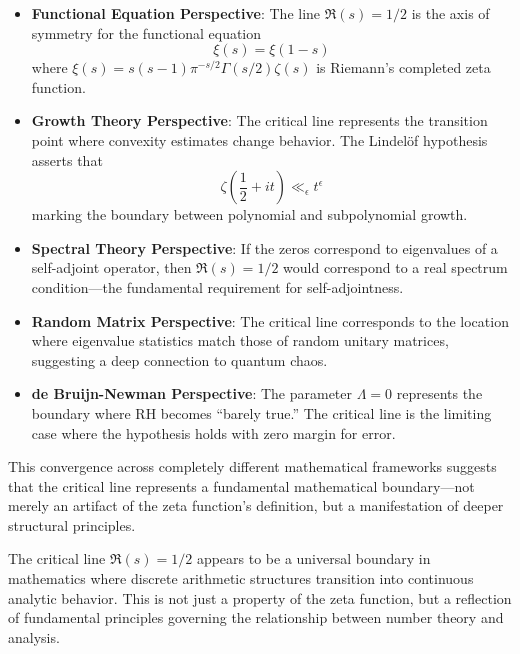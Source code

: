 \begin{itemize}
\item \textbf{Functional Equation Perspective}: The line $\Re(s) = 1/2$ is the axis of symmetry for the functional equation
\begin{equation}
\xi(s) = \xi(1-s)
\end{equation}
where $\xi(s) = s(s-1)\pi^{-s/2}\Gamma(s/2)\zeta(s)$ is Riemann's completed zeta function.

\item \textbf{Growth Theory Perspective}: The critical line represents the transition point where convexity estimates change behavior. The Lindel\"of hypothesis asserts that
\begin{equation}
\zeta\left(\frac{1}{2} + it\right) \ll_\epsilon t^\epsilon
\end{equation}
marking the boundary between polynomial and subpolynomial growth.

\item \textbf{Spectral Theory Perspective}: If the zeros correspond to eigenvalues of a self-adjoint operator, then $\Re(s) = 1/2$ would correspond to a real spectrum condition—the fundamental requirement for self-adjointness.

\item \textbf{Random Matrix Perspective}: The critical line corresponds to the location where eigenvalue statistics match those of random unitary matrices, suggesting a deep connection to quantum chaos.

\item \textbf{de Bruijn-Newman Perspective}: The parameter $\Lambda = 0$ represents the boundary where RH becomes ``barely true.'' The critical line is the limiting case where the hypothesis holds with zero margin for error.
\end{itemize}

This convergence across completely different mathematical frameworks suggests that the critical line represents a fundamental mathematical boundary—not merely an artifact of the zeta function's definition, but a manifestation of deeper structural principles.

\begin{insight}
The critical line $\Re(s) = 1/2$ appears to be a universal boundary in mathematics where discrete arithmetic structures transition into continuous analytic behavior. This is not just a property of the zeta function, but a reflection of fundamental principles governing the relationship between number theory and analysis.
\end{insight}

